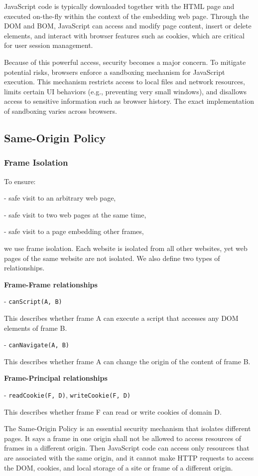 JavaScript code is typically downloaded together with the HTML page and executed on-the-fly within the context of the embedding web page. Through the DOM and BOM, JavaScript can access and modify page content, insert or delete elements, and interact with browser features such as cookies, which are critical for user session management.

Because of this powerful access, security becomes a major concern. To mitigate potential risks, browsers enforce a sandboxing mechanism for JavaScript execution. This mechanism restricts access to local files and network resources, limits certain UI behaviors (e.g., preventing very small windows), and disallows access to sensitive information such as browser history. The exact implementation of sandboxing varies across browsers.

\subsection{Same-Origin Policy}

\subsubsection{Frame Isolation}
To ensure:

- safe visit to an arbitrary web page,

- safe visit to two web pages at the same time,

- safe visit to a page embedding other frames,

we use frame isolation. Each website is isolated from all other websites, yet web pages of the same website are not isolated. We also define two types of relationships.

\textbf{Frame-Frame relationships}

- \texttt{canScript(A, B)}

This describes whether frame A can execute a script that accesses any DOM elements of frame B.

- \texttt{canNavigate(A, B)}

This describes whether frame A can change the origin of the content of frame B. 

\textbf{Frame-Principal relationships}

- \texttt{readCookie(F, D)}, \texttt{writeCookie(F, D)}

This describes whether frame F can read or write cookies of domain D. 

The Same-Origin Policy is an essential security mechanism that isolates different pages. It says a frame in one origin shall not be allowed to access resources of frames in a different origin. Then JavaScript code can access only resources that are associated with the same origin, and it cannot make HTTP requests to access the DOM, cookies, and local storage of a site or frame of a different origin. 

